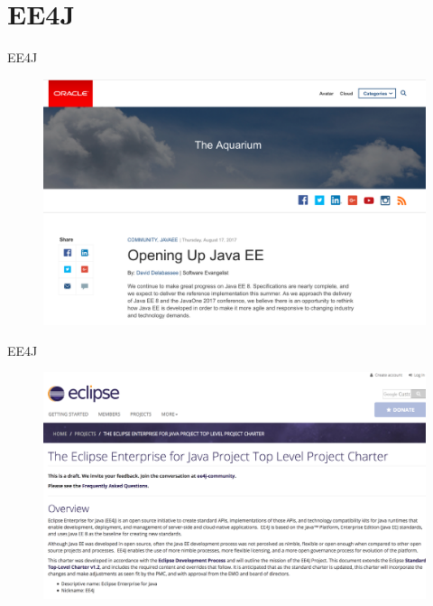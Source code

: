 \documentclass{beamer}
\begin{document}
\section{EE4J}


\begin{frame}{EE4J}
\begin{figure}
	\centering
	\includegraphics[width=\linewidth]{Images/javaeeopen}
\end{figure}
\end{frame}

\begin{frame}{EE4J}
\begin{figure}
	\centering
	\includegraphics[width=\linewidth]{Images/ee4j}
\end{figure}
\end{frame}
\end{document}
